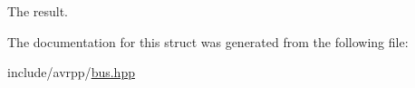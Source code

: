 The result. 



The documentation for this struct was generated from the following file:\begin{DoxyCompactItemize}
\item 
include/avrpp/\hyperlink{bus_8hpp}{bus.hpp}\end{DoxyCompactItemize}
